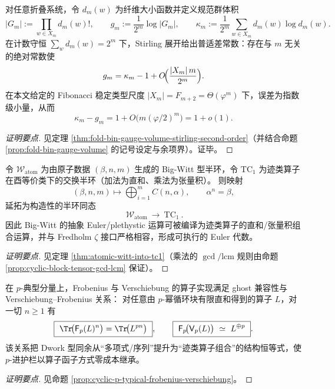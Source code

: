 \begin{conclusion}\label{con:xi-fold-gauge-volume-codim1-constant}
对任意折叠系统，令 \(d_m(w)\) 为纤维大小函数并定义规范群体积
\[
|G_m|:=\prod_{w\in X_m} d_m(w)!,
\qquad
g_m:=\frac{1}{2^m}\log|G_m|,
\qquad
\kappa_m:=\frac{1}{2^m}\sum_{w\in X_m} d_m(w)\log d_m(w).
\]
在计数守恒 \(\sum_w d_m(w)=2^m\) 下，Stirling 展开给出普适差常数：存在与 \(m\) 无关的绝对常数使
\[
g_m=\kappa_m-1+O\!\Bigl(\frac{|X_m|\,m}{2^m}\Bigr).
\]
在本文给定的 Fibonacci 稳定类型尺度 \(|X_m|=F_{m+2}=\Theta(\varphi^m)\) 下，误差为指数级小量，从而
\[
\kappa_m-g_m=1+O\!\bigl(m(\varphi/2)^m\bigr)=1+o(1).
\]
\end{conclusion}
\begin{proof}[证明要点]
见定理 \ref{thm:fold-bin-gauge-volume-stirling-second-order}（并结合命题 \ref{prop:fold-bin-gauge-volume} 的记号设定与余项界）。证毕。
\end{proof}


\begin{conclusion}\label{con:xi-atomic-witt-operator-compilation}
令 \(\mathcal{W}_{\mathrm{atom}}\) 为由原子数据 \((\beta,n,m)\) 生成的 Big-Witt 型半环，令 \(\mathrm{TC}_1\) 为迹类算子在酉等价类下的交换半环（加法为直和、乘法为张量积）。
则映射
\[
(\beta,n,m)\longmapsto \bigoplus_{i=1}^{m} C(n,\alpha),\qquad \alpha^n=\beta,
\]
延拓为构造性的半环同态
\[
\boxed{\ \mathcal{W}_{\mathrm{atom}}\ \longrightarrow\ \mathrm{TC}_1\ }.
\]
因此 Big-Witt 的抽象 Euler/plethystic 运算可被编译为迹类算子的直和/张量积组合运算，并与 Fredholm \(\zeta\) 接口严格相容，形成可执行的 Euler 代数。
\end{conclusion}
\begin{proof}[证明要点]
见定理 \ref{thm:atomic-witt-into-tc1}（乘法的 \(\gcd/\mathrm{lcm}\) 规则由命题 \ref{prop:cyclic-block-tensor-gcd-lcm} 保证）。
\end{proof}

\begin{conclusion}\label{con:xi-ptypical-frobenius-verschiebung-trace}
在 \(p\)-典型分量上，Frobenius 与 Verschiebung 的算子实现满足 ghost 兼容性与 Verschiebung--Frobenius 关系：
对任意由 \(p\)-幂循环块有限直和得到的算子 \(L\)，对一切 \(n\ge 1\) 有
\[
\boxed{\ \Tr\!\bigl(\mathsf F_p(L)^n\bigr)=\Tr\!\bigl(L^{pn}\bigr)\ },
\qquad
\boxed{\ \mathsf F_p\!\bigl(\mathsf V_p(L)\bigr)\ \simeq\ L^{\oplus p}\ }.
\]
该关系把 Dwork 型同余从“多项式/序列”提升为“迹类算子组合”的结构恒等式，使 \(p\)-进护栏以算子函子方式零成本继承。
\end{conclusion}
\begin{proof}[证明要点]
见命题 \ref{prop:cyclic-p-typical-frobenius-verschiebung}。
\end{proof}

